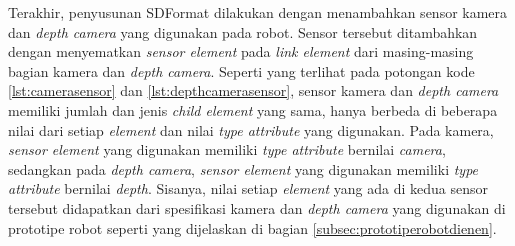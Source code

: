 

Terakhir, penyusunan SDFormat dilakukan dengan menambahkan sensor kamera dan \emph{depth camera} yang digunakan pada robot.
Sensor tersebut ditambahkan dengan menyematkan \emph{sensor element} pada \emph{link element} dari masing-masing bagian kamera dan \emph{depth camera}.
Seperti yang terlihat pada potongan kode \ref{lst:camerasensor} dan \ref{lst:depthcamerasensor},
  sensor kamera dan \emph{depth camera} memiliki jumlah dan jenis \emph{child element} yang sama,
  hanya berbeda di beberapa nilai dari setiap \emph{element} dan nilai \emph{type attribute} yang digunakan.
  Pada kamera, \emph{sensor element} yang digunakan memiliki \emph{type attribute} bernilai \emph{camera},
  sedangkan pada \emph{depth camera}, \emph{sensor element} yang digunakan memiliki \emph{type attribute} bernilai \emph{depth}.
  Sisanya, nilai setiap \emph{element} yang ada di kedua sensor tersebut didapatkan dari spesifikasi kamera dan \emph{depth camera} yang digunakan di prototipe robot seperti yang dijelaskan di bagian \ref{subsec:prototiperobotdienen}.




